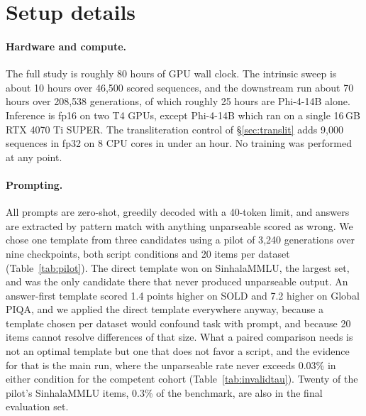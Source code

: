 \documentclass{article}
\begin{document}
\section{Setup details}
\label{sec:setupfull}

\paragraph{Hardware and compute.} The full study is roughly 80 hours of GPU wall
clock. The intrinsic sweep is about 10 hours over 46{,}500 scored sequences, and the
downstream run about 70 hours over 208{,}538 generations, of which roughly 25 hours
are Phi-4-14B alone. Inference is fp16 on two T4 GPUs, except Phi-4-14B which ran on
a single 16\,GB RTX 4070 Ti SUPER. The transliteration control of
\S\ref{sec:translit} adds 9{,}000 sequences in fp32 on 8 CPU cores in under an hour.
No training was performed at any point.

\paragraph{Prompting.} All prompts are zero-shot, greedily decoded with a 40-token
limit, and answers are extracted by pattern match with anything unparseable scored as
wrong. We chose one template from three candidates using a pilot of 3{,}240
generations over nine checkpoints, both script conditions and 20 items per dataset
(Table~\ref{tab:pilot}). The direct template won on SinhalaMMLU, the largest set, and
was the only candidate there that never produced unparseable output. An answer-first
template scored 1.4 points higher on SOLD and 7.2 higher on Global PIQA, and we
applied the direct template everywhere anyway, because a template chosen per dataset
would confound task with prompt, and because 20 items cannot resolve differences of
that size. What a paired comparison needs is not an optimal template but one that
does not favor a script, and the evidence for that is the main run, where the
unparseable rate never exceeds 0.03\% in either condition for the competent cohort
(Table~\ref{tab:invalidtau}). Twenty of the pilot's SinhalaMMLU items, 0.3\% of the
benchmark, are also in the final evaluation set.
\end{document}
